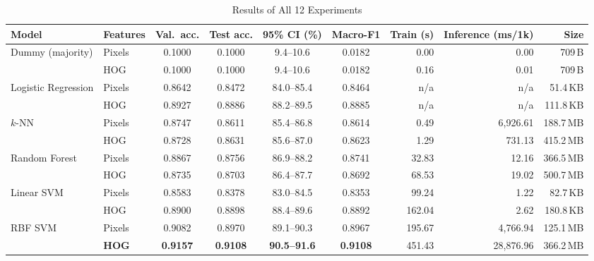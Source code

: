 \documentclass[conference]{IEEEtran}
\newcommand{\best}[1]{\textbf{#1}}
\begin{document}
\begin{table}[t]
  \centering
  \begin{threeparttable}
  \caption{Results of All 12 Experiments}
  \label{tab:results}
  \setlength{\tabcolsep}{5pt}
  \begin{tabular}{@{}l l c c c c r r r@{}}
    \toprule
    Model & Features & Val.\ acc. & Test acc. & 95\% CI (\%) & Macro-F1 & Train (s) & Inference (ms/1k) & Size \\
    \midrule
    \multirow{2}{*}{Dummy (majority)} & Pixels & 0.1000 & 0.1000 & 9.4--10.6 & 0.0182 & 0.00 & 0.00\tnote{a} & 709\,B \\
                                      & HOG    & 0.1000 & 0.1000 & 9.4--10.6 & 0.0182 & 0.16 & 0.01\tnote{a} & 709\,B \\
    \midrule
    \multirow{2}{*}{Logistic Regression} & Pixels & 0.8642 & 0.8472 & 84.0--85.4 & 0.8464 & n/a\tnote{b} & n/a\tnote{b} & 51.4\,KB \\
                                         & HOG    & 0.8927 & 0.8886 & 88.2--89.5 & 0.8885 & n/a\tnote{b} & n/a\tnote{b} & 111.8\,KB \\
    \midrule
    \multirow{2}{*}{$k$-NN} & Pixels & 0.8747 & 0.8611 & 85.4--86.8 & 0.8614 & 0.49 & 6{,}926.61 & 188.7\,MB \\
                            & HOG    & 0.8728 & 0.8631 & 85.6--87.0 & 0.8623 & 1.29 & 731.13 & 415.2\,MB \\
    \midrule
    \multirow{2}{*}{Random Forest} & Pixels & 0.8867 & 0.8756 & 86.9--88.2 & 0.8741 & 32.83 & 12.16 & 366.5\,MB \\
                                   & HOG    & 0.8735 & 0.8703 & 86.4--87.7 & 0.8692 & 68.53 & 19.02 & 500.7\,MB \\
    \midrule
    \multirow{2}{*}{Linear SVM} & Pixels & 0.8583 & 0.8378 & 83.0--84.5 & 0.8353 & 99.24 & 1.22 & 82.7\,KB \\
                                & HOG    & 0.8900 & 0.8898 & 88.4--89.6 & 0.8892 & 162.04 & 2.62 & 180.8\,KB \\
    \midrule
    \multirow{2}{*}{RBF SVM} & Pixels & 0.9082 & 0.8970 & 89.1--90.3 & 0.8967 & 195.67 & 4{,}766.94 & 125.1\,MB \\
    & \best{HOG} & \best{0.9157} & \best{0.9108} & \best{90.5--91.6} & \best{0.9108} & 451.43 & 28{,}876.96\tnote{c} & 366.2\,MB \\
    \bottomrule
  \end{tabular}
  \begin{tablenotes}\footnotesize

\end{tablenotes}
\end{threeparttable}
\end{table}
\end{document}

